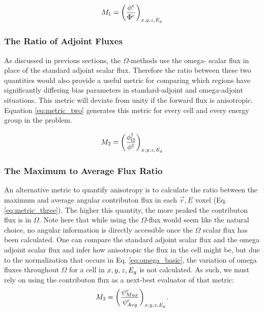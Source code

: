 \begin{equation}
  M_{1} = \bigg(\frac{\phi^{c}}{\Phi^{c}}\bigg)_{x,y,z,E_g}
  \label{eq:metric_one}
\end{equation}

\subsubsection{The Ratio of Adjoint Fluxes}

As discussed in previous sections, the $\Omega$-methods use the omega- scalar
flux in place of the standard adjoint scalar flux. Therefore the ratio between
these two quantities would also provide a useful metric for comparing which
regions have significantly differing bias parameters in standard-adjoint and
omega-adjoint situations. This metric will deviate from unity if the forward
flux is anisotropic. Equation \ref{eq:metric_two} generates this metric for
every cell and every energy group in the problem.

\begin{equation}
  M_{2} = \bigg(\frac{\phi^{\dagger}_{\Omega}}{\phi^{\dagger}}\bigg)_{x,y,z,E_g}
  \label{eq:metric_two}
\end{equation}

\subsubsection{The Maximum to Average Flux Ratio}

An alternative metric to quantify anisotropy is to calculate the ratio between
the maximum and average angular contributon flux in each $\vec{r} , E$ voxel (Eq.
\ref{eq:metric_three}).
The higher this quantity, the more peaked the contributon flux is in $\Omega$.
Note here that while using the $\Omega$-flux would seem like the natural choice,
no angular information is directly accessible once the $\Omega$ scalar flux has
been calculated. One can compare the standard adjoint scalar flux and the omega
adjoint scalar flux and infer how anisotropic the flux in the cell might be, but
due to the normalization that occurs in Eq. \ref{eq:omega_basic}, the
variation of omega fluxes throughout $\Omega$ for a cell in $x,y,z,E_g$ is not
calculated. As such, we must rely on using the contributon flux as a next-best
evaluator of that metric:
%
\begin{equation}
  M_{3} = \bigg(\frac{\psi^{c}_{Max}}{\psi^{c}_{
          Avg}}\bigg)_{x,y,z,E_g}  .
  \label{eq:metric_three}
\end{equation}

